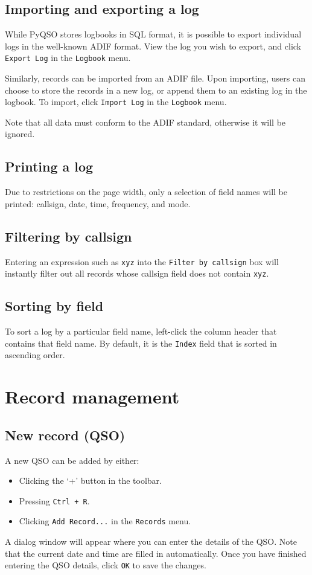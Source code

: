 \documentclass[11pt, a4paper]{report}
\begin{document}
\section{Importing and exporting a log}
While PyQSO stores logbooks in SQL format, it is possible to export individual logs in the well-known ADIF format. View the log you wish to export, and click \texttt{Export Log} in the \texttt{Logbook} menu.

Similarly, records can be imported from an ADIF file. Upon importing, users can choose to store the records in a new log, or append them to an existing log in the logbook. To import, click \texttt{Import Log} in the \texttt{Logbook} menu.

Note that all data must conform to the ADIF standard, otherwise it will be ignored.

\section{Printing a log}
Due to restrictions on the page width, only a selection of field names will be printed: callsign, date, time, frequency, and mode.

\section{Filtering by callsign}
Entering an expression such as \texttt{xyz} into the \texttt{Filter by callsign} box will instantly filter out all records whose callsign field does not contain \texttt{xyz}.

\section{Sorting by field}
To sort a log by a particular field name, left-click the column header that contains that field name. By default, it is the \texttt{Index} field that is sorted in ascending order.

\chapter{Record management}\label{chap:record_management}

\section{New record (QSO)}
A new QSO can be added by either:
\begin{itemize}
  \item Clicking the `+' button in the toolbar.
  \item Pressing \texttt{Ctrl + R}.
  \item Clicking \texttt{Add Record...} in the \texttt{Records} menu.
\end{itemize}
A dialog window will appear where you can enter the details of the QSO. Note that the current date and time are filled in automatically. Once you have finished entering the QSO details, click \texttt{OK} to save the changes.
\end{document}
